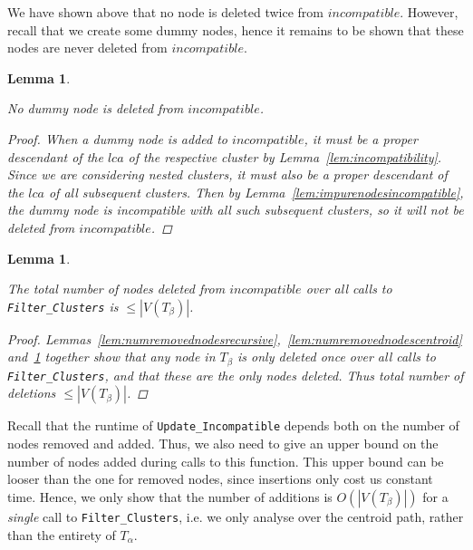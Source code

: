\documentclass{article}
\newcommand{\TA}{T_\alpha}
\newcommand{\TB}{T_\beta}
\newtheorem{numremovednodesdummy}[incompatibility]{Lemma}
\newtheorem{numremovednodes}[incompatibility]{Lemma}
\begin{document}
    We have shown above that no node is deleted twice from $incompatible$. However, recall that we create some dummy nodes, hence it remains to be shown that these nodes are never deleted from $incompatible$.
    \newline

    \begin{numremovednodesdummy}
        \label{lem:numremovednodesdummy}

        No dummy node is deleted from $incompatible$.

        \begin{proof}
            When a dummy node is added to $incompatible$, it must be a proper descendant of the $lca$ of the respective cluster by Lemma~\ref{lem:incompatibility}. Since we are considering nested clusters, it must also be a proper descendant of the $lca$ of all subsequent clusters. Then by Lemma~\ref{lem:impurenodesincompatible}, the dummy node is incompatible with all such subsequent clusters, so it will not be deleted from $incompatible$.
        \end{proof}
    \end{numremovednodesdummy}

    \medskip
    \begin{numremovednodes}
        \label{lem:numremovednodes}

        The total number of nodes deleted from $incompatible$ over all calls to \texttt{Filter\_Clusters} is $\leq |V(\TB)|$.

        \begin{proof}
            Lemmas~\ref{lem:numremovednodesrecursive},~\ref{lem:numremovednodescentroid} and~\ref{lem:numremovednodesdummy} together show that any node in $\TB$ is only deleted once over all calls to \texttt{Filter\_Clusters}, and that these are the only nodes deleted. Thus total number of deletions $\leq |V(\TB)|$.
        \end{proof}
    \end{numremovednodes}

    Recall that the runtime of \texttt{Update\_Incompatible} depends both on the number of nodes removed and added. Thus, we also need to give an upper bound on the number of nodes added during calls to this function. This upper bound can be looser than the one for removed nodes, since insertions only cost us constant time. Hence, we only show that the number of additions is $O(|V(\TB)|)$ for a \textit{single} call to \texttt{Filter\_Clusters}, i.e. we only analyse over the centroid path, rather than the entirety of $\TA$.
    \newline
\end{document}
